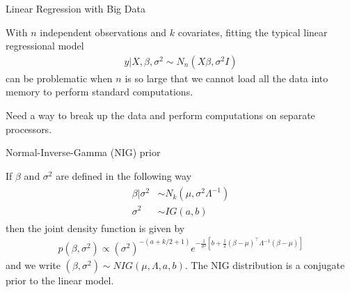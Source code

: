 \documentclass[mathserif, 11pt, t]{beamer}
\begin{document}





% 
% 

\begin{frame}{Linear Regression with Big Data}

With $n$ independent observations and $k$ covariates, fitting the typical linear regressional model
\begin{align}
y|X,\beta,\sigma^2 \sim N_n\left(X\beta,\sigma^2 I\right)
\end{align}
can be problematic when $n$ is so large that we cannot load all the data into memory to perform standard computations.
\bigskip

Need a way to break up the data and perform computations on separate processors.

\end{frame}


\begin{frame}{Normal-Inverse-Gamma (NIG) prior}

If $\beta$ and $\sigma^2$ are defined in the following way
\begin{align}
\begin{split}
\beta | \sigma^2 & \sim N_k(\mu, \sigma^2 \Lambda^{-1}) \\
\sigma^2 & \sim IG(a, b)
\end{split}
\end{align}
then the joint density function is given by
\begin{align}
p(\beta, \sigma^2) \propto (\sigma^2)^{-(a+k/2+1)}e^{-\frac{1}{\sigma^2}\left[b+\frac{1}{2}(\beta-\mu)^\top \Lambda^{-1}(\beta-\mu)\right]}
\end{align}
and we write $(\beta,\sigma^2)\sim NIG(\mu, \Lambda, a, b)$. The NIG distribution is a conjugate prior to the linear model.

\end{frame}
\end{document}
